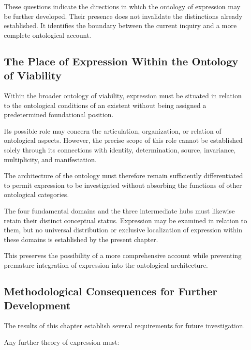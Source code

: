 These questions indicate the directions in which
the ontology of expression may be further developed.
Their presence does not invalidate the distinctions
already established. It identifies the boundary
between the current inquiry and a more complete
ontological account.

\subsection{The Place of Expression Within the Ontology of Viability}

Within the broader ontology of viability, expression
must be situated in relation to the ontological
conditions of an existent without being assigned
a predetermined foundational position.

Its possible role may concern the articulation,
organization, or relation of ontological aspects.
However, the precise scope of this role cannot be
established solely through its connections with
identity, determination, source, invariance,
multiplicity, and manifestation.

The architecture of the ontology must therefore
remain sufficiently differentiated to permit
expression to be investigated without absorbing
the functions of other ontological categories.

The four fundamental domains and the three
intermediate hubs must likewise retain their
distinct conceptual status. Expression may be
examined in relation to them, but no universal
distribution or exclusive localization of expression
within these domains is established by the present
chapter.

This preserves the possibility of a more comprehensive
account while preventing premature integration
of expression into the ontological architecture.

\subsection{Methodological Consequences for Further Development}

The results of this chapter establish several
requirements for future investigation.

Any further theory of expression must:

